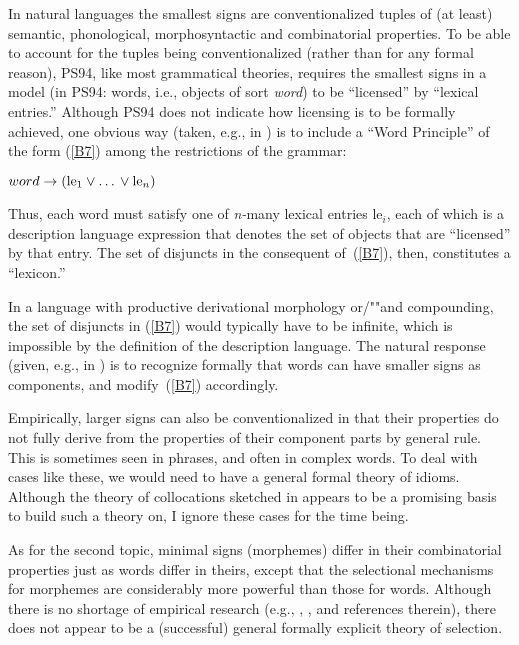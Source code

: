 \documentclass[output=paper]{langsci/langscibook}
\begin{document}
In natural languages the smallest signs are conventionalized tuples of (at
least) semantic, phonological, morphosyntactic and combinatorial
properties. To be able to account for the tuples being conventionalized
(rather than for any formal reason), {\small PS94}, like most grammatical
theories, requires the smallest signs in a model (in {\small PS94}: words,
i.e., objects of sort \textit{word}\/) to be ``licensed'' by ``lexical
entries.'' Although {\small PS94} does not indicate how licensing is to be
formally achieved, one obvious way (taken, e.g.,
in \citealt{Pollard93}) is to include a ``Word
Principle'' of the form (\ref{B7}) among the
restrictions of the grammar: 
\begin{exe}
\ex
\label{B7}
$word \rightarrow (\mbox{le}_1 \vee   \ldots{} \vee  \mbox{le}_n\/)$   
\end{exe}
Thus, each word must satisfy one of \textit{n-}many lexical entries le$_i$,
each of which is a description language expression that denotes the set of
objects that are ``licensed'' by that entry. The set of disjuncts in the
consequent of~(\ref{B7}), then, constitutes a ``lexicon.''

In a language with productive derivational morphology or/""and compounding,
the set of disjuncts in (\ref{B7}) would typically have to be infinite,
which is impossible by the definition of the description language. The
natural response (given, e.g., in \citealt{kri:ner:93}) is to recognize formally that words can
have smaller signs as components, and modify~(\ref{B7}) accordingly.

Empirically, larger signs can also be conventionalized in that their
properties do not fully derive from the properties of their component parts
by general rule. This is sometimes seen in phrases, and often in complex
words. To deal with cases like these, we would need to have a general
formal theory of idioms. Although the theory of collocations sketched
in \cite[{}\S{}4]{ric:sai:98}
appears to be a promising basis to build such a theory on, I ignore these
cases for the time being.

As for the second topic, minimal signs (morphemes) differ in their
combinatorial properties just 
as words differ in theirs, except that the
selectional mechanisms for morphemes are considerably more powerful than
those for words. Although there is no shortage of empirical research (e.g.,
\citealt{fabb:88}, \citealt{ston:94}, and
references therein), there does not appear to be a (successful) general
formally explicit theory of selection.
\end{document}
